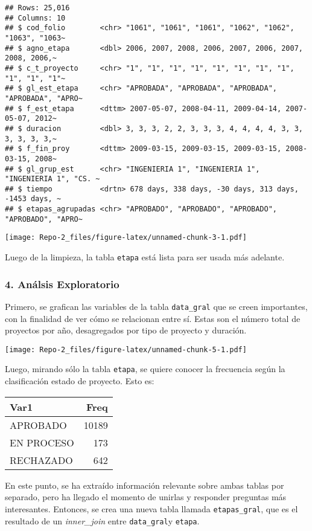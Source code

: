 \documentclass[
]{article}
\begin{document}
\begin{verbatim}
## Rows: 25,016
## Columns: 10
## $ cod_folio        <chr> "1061", "1061", "1061", "1062", "1062", "1063", "1063~
## $ agno_etapa       <dbl> 2006, 2007, 2008, 2006, 2007, 2006, 2007, 2008, 2006,~
## $ c_t_proyecto     <chr> "1", "1", "1", "1", "1", "1", "1", "1", "1", "1", "1"~
## $ gl_est_etapa     <chr> "APROBADA", "APROBADA", "APROBADA", "APROBADA", "APRO~
## $ f_est_etapa      <dttm> 2007-05-07, 2008-04-11, 2009-04-14, 2007-05-07, 2012~
## $ duracion         <dbl> 3, 3, 3, 2, 2, 3, 3, 3, 4, 4, 4, 4, 3, 3, 3, 3, 3, 3,~
## $ f_fin_proy       <dttm> 2009-03-15, 2009-03-15, 2009-03-15, 2008-03-15, 2008~
## $ gl_grup_est      <chr> "INGENIERIA 1", "INGENIERIA 1", "INGENIERIA 1", "CS. ~
## $ tiempo           <drtn> 678 days, 338 days, -30 days, 313 days, -1453 days, ~
## $ etapas_agrupadas <chr> "APROBADO", "APROBADO", "APROBADO", "APROBADO", "APRO~
\end{verbatim}

\texttt{[image: Repo-2\_files/figure-latex/unnamed-chunk-3-1.pdf]}

Luego de la limpieza, la tabla \texttt{etapa} está lista para ser usada
más adelante.

\hypertarget{anuxe1lsis-exploratorio}{%
\subsubsection{4. Análsis Exploratorio}\label{anuxe1lsis-exploratorio}}

Primero, se grafican las variables de la tabla \texttt{data\_gral} que
se creen importantes, con la finalidad de ver cómo se relacionan entre
sí. Estas son el número total de proyectos por año, desagregados por
tipo de proyecto y duración.

\texttt{[image: Repo-2\_files/figure-latex/unnamed-chunk-5-1.pdf]}

Luego, mirando sólo la tabla \texttt{etapa}, se quiere conocer la
frecuencia según la clasificación estado de proyecto. Esto es:

\begin{longtable}[]{@{}lr@{}}
\toprule
Var1 & Freq \\
\midrule
\endhead
APROBADO & 10189 \\
EN PROCESO & 173 \\
RECHAZADO & 642 \\
\bottomrule
\end{longtable}

En este punto, se ha extraído información relevante sobre ambas tablas
por separado, pero ha llegado el momento de unirlas y responder
preguntas más interesantes. Entonces, se crea una nueva tabla llamada
\texttt{etapas\_gral}, que es el resultado de un \emph{inner\_join}
entre \texttt{data\_gral}y \texttt{etapa}.
\end{document}
